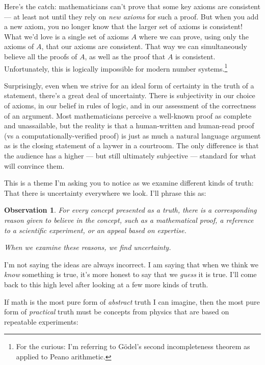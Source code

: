 \documentclass[11pt, oneside]{article}   	%
\newtheorem{obs}{Observation}
\begin{document}
\begin{itemize}
        Here's the catch: mathematicians can't prove that some key axioms are
        consistent --- at least not until they rely on {\em new axioms} for such
        a proof. But when you add a new axiom, you no longer know that the
        larger set of axioms is consistent! What we'd love is a single set of
        axioms $A$ where we can prove, using only the axioms of $A$, that our
        axioms are consistent. That way we can simultaneously believe all the
        proofs of $A$, as
        well as the proof that $A$ is consistent. Unfortunately, this is
        logically impossible for modern number
        systems.\footnote{For
        the curious: I'm referring to G\"odel's second
        incompleteness theorem as applied to Peano arithmetic.}
\end{itemize}

Surprisingly,
even when we strive for an ideal form of
certainty in the truth of a statement, there's a great deal of uncertainty.
There is subjectivity in our choice of axioms, in our belief in rules of logic,
and in our assessment of the correctness of an argument.
Most mathematicians perceive a well-known proof as complete and unassailable,
but the reality is that a human-written and human-read proof (vs
a computationally-verified proof) is just as much a natural language argument as
is the closing statement of a laywer in a courtroom.
The only difference is that the audience has a higher --- but still ultimately
subjective --- standard for what will convince them.

This is a theme I'm asking you to notice as we examine different kinds of
truth: That there is uncertainty everywhere we look. I'll phrase this as:

\begin{obs}
    For every concept presented as a truth, there is a corresponding reason
    given to believe in the concept, such as a mathematical proof, a reference
    to a scientific experiment, or an appeal based on expertise.

    When we examine these reasons, we find uncertainty.
\end{obs}

I'm not saying the ideas are always incorrect. I am saying that when we think we
{\em know} something is true, it's more honest to say that we {\em guess} it is
true. I'll come back to this high level after looking at a few more kinds of
truth.

If math is the most pure form of {\em abstract} truth I can imagine, then the
most pure form of {\em practical} truth must be concepts from physics that are
based on repeatable experiments:
\end{document}
